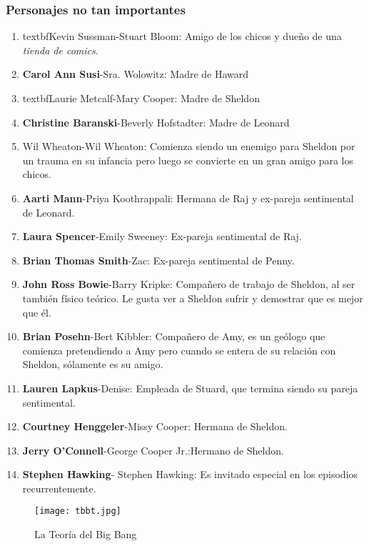 \documentclass[a5paper, 11pt]{article}
\begin{document}
\subsubsection{Personajes no tan importantes}
\begin{enumerate}
    \item textbf{Kevin Sussman}-Stuart Bloom: Amigo de los chicos y dueño de una \emph{tienda de comics}.
    \item \textbf {Carol Ann Susi}-Sra. Wolowitz: Madre de Haward
    \item textbf{Laurie Metcalf}-Mary Cooper: Madre de Sheldon
    \item \textbf{Christine Baranski}-Beverly Hofstadter: Madre de Leonard
    \item {Wil Wheaton}-Wil Wheaton: Comienza siendo un enemigo para Sheldon por un trauma en su infancia pero luego se convierte en un gran amigo para los chicos.
    \item \textbf{Aarti Mann}-Priya Koothrappali: Hermana de Raj y ex-pareja sentimental de Leonard.
    \item \textbf{Laura Spencer}-Emily Sweeney: Ex-pareja sentimental de Raj.
    \item \textbf {Brian Thomas Smith}-Zac: Ex-pareja sentimental de Penny.
    \item \textbf{John Ross Bowie}-Barry Kripke: Compañero de trabajo de Sheldon, al ser también físico teórico. Le gusta ver a Sheldon sufrir y demostrar que es mejor que él.
    \item \textbf{Brian Posehn}-Bert Kibbler: Compañero de Amy, es un geólogo que comienza pretendiendo a Amy pero cuando se entera de su relación con Sheldon, sólamente es su amigo.
    \item \textbf{Lauren Lapkus}-Denise: Empleada de Stuard, que termina siendo su pareja sentimental.
    \item \textbf{Courtney Henggeler}-Missy Cooper: Hermana de Sheldon.
    \item \textbf{Jerry O'Connell}-George Cooper Jr.:Hermano de Sheldon.
    \item \textbf{Stephen Hawking}- Stephen Hawking: Es invitado especial en los episodios recurrentemente.
\end{enumerate}

\begin{figure}[H]
    \raggedleft
    \caption{La Teoría del Big Bang}
    \texttt{[image: tbbt.jpg]}
    \label{fig:my_label}
\end{figure}
\end{document}
